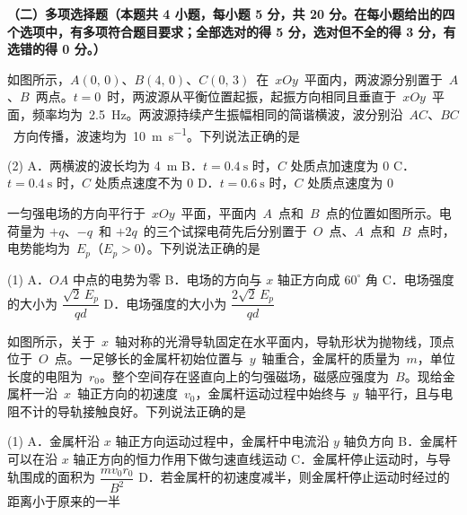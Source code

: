 \textbf{（二）多项选择题（本题共 4 小题，每小题 5 分，共 20 分。在每小题给出的四个选项中，有多项符合题目要求；全部选对的得 5 分，选对但不全的得 3 分，有选错的得 0 分。）}

\begin{question}
如图所示，$A(0,\,0)$、$B(4,\,0)$、$C(0,\,3)$~在~$xOy$~平面内，两波源分别置于~$A$、$B$~两点。$t=0$~时，两波源从平衡位置起振，起振方向相同且垂直于~$xOy$~平面，频率均为~\SI{2.5}{\hertz}。两波源持续产生振幅相同的简谐横波，波分别沿~$AC$、$BC$~方向传播，波速均为~\SI{10}{\metre\per\second}。下列说法正确的是\gkblank


\begin{gkopts}(2)
  \task A．两横波的波长均为 \SI{4}{\metre}
  \task B．$t=\SI{0.4}{\second}$ 时，$C$ 处质点加速度为 0
  \task C．$t=\SI{0.4}{\second}$ 时，$C$ 处质点速度不为 0
  \task D．$t=\SI{0.6}{\second}$ 时，$C$ 处质点速度为 0
\end{gkopts}
\end{question}

\begin{question}
一匀强电场的方向平行于~$xOy$~平面，平面内~$A$~点和~$B$~点的位置如图所示。电荷量为 $+q$、$-q$~和 $+2q$~的三个试探电荷先后分别置于~$O$~点、$A$~点和~$B$~点时，电势能均为~$E_{p}$（$E_{p}>0$）。下列说法正确的是\gkblank


\begin{gkopts}(1)
  \task A．$OA$ 中点的电势为零
  \task B．电场的方向与 $x$ 轴正方向成 $60^{\circ}$ 角
  \task C．电场强度的大小为 $\dfrac{\sqrt{2}\,E_{p}}{qd}$
  \task D．电场强度的大小为 $\dfrac{2\sqrt{2}\,E_{p}}{qd}$
\end{gkopts}
\end{question}

\begin{question}
如图所示，关于~$x$~轴对称的光滑导轨固定在水平面内，导轨形状为抛物线，顶点位于~$O$~点。一足够长的金属杆初始位置与~$y$~轴重合，金属杆的质量为~$m$，单位长度的电阻为~$r_{0}$。整个空间存在竖直向上的匀强磁场，磁感应强度为~$B$。现给金属杆一沿~$x$~轴正方向的初速度~$v_{0}$，金属杆运动过程中始终与~$y$~轴平行，且与电阻不计的导轨接触良好。下列说法正确的是\gkblank


\begin{gkopts}(1)
  \task A．金属杆沿 $x$ 轴正方向运动过程中，金属杆中电流沿 $y$ 轴负方向
  \task B．金属杆可以在沿 $x$ 轴正方向的恒力作用下做匀速直线运动
  \task C．金属杆停止运动时，与导轨围成的面积为 $\dfrac{mv_{0}r_{0}}{B^{2}}$
  \task D．若金属杆的初速度减半，则金属杆停止运动时经过的距离小于原来的一半
\end{gkopts}
\end{question}

